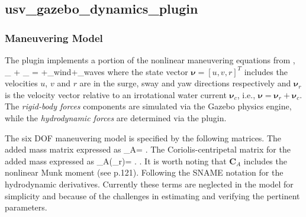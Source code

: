 \documentclass[11pt]{article}
\begin{document}
\subsection{ usv\_gazebo\_dynamics\_plugin }

\subsubsection{Maneuvering Model}
The plugin implements a portion of the nonlinear maneuvering equations from \cite{fossen11handbook}, 
\beqn
{}_ +
_
= \bm{\tau}+\bm{\tau}_{wind}+\bm{\tau}_{waves}
\label{e:fossenmodel}
\eeqn
where the state vector $\bm{\nu}=[u,v,r]^T$ includes the velocities $u$, $v$ and $r$ are in the surge, sway and yaw directions respectively and  $\bm{\nu}_r$ is the velocity vector relative to an irrotational water current $\bm{\nu}_c$, i.e., $\bm{\nu}=\bm{\nu}_r+\bm{\nu}_c$.
The \emph{rigid-body forces} components are simulated via the Gazebo physics engine, while the \emph{hydrodynamic forces} are determined via the plugin.


The six DOF maneuvering model is specified by the following matrices. The added mass matrix expressed as 
\beqn
{}_{A}= .
\eeqn
The Coriolis-centripetal matrix for the added mass expressed as 
\beqn
{}_{A}(\bm{\nu}_r)= .
\eeqn.
It is worth noting that $\bm{C}_A$ includes the nonlinear Munk moment (see \cite{fossen11handbook} p.121).  Following \cite{fossen11handbook} the SNAME notation for the hydrodynamic derivatives.  Currently these terms are neglected in the model for simplicity and because of the challenges in estimating and verifying the pertinent parameters.
\end{document}
